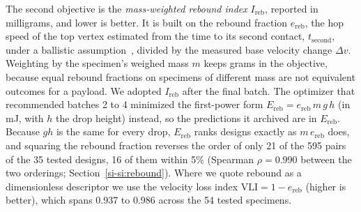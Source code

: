 \documentclass[lineno,nocopyright,upint,varvw,hyphenate]{asmejour}
\newcommand{\siref}[1]{\ref*{si-#1}}
\begin{document}
The second objective is the \emph{mass-weighted rebound index}
$I_{\mathrm{reb}}$, reported in milligrams, and lower is better. It is
built on the rebound fraction $e_{\mathrm{reb}}$, the hop speed of the
top vertex estimated from the time to its second contact,
$t_{\mathrm{second}}$, under a ballistic
assumption~\citep{bernstein1977listening}, divided by the measured base
velocity change $\Delta v$. Weighting by the specimen's weighed mass $m$
keeps grams in the objective, because equal rebound fractions on
specimens of different mass are not equivalent outcomes for a payload.
We adopted $I_{\mathrm{reb}}$ after the final batch. The optimizer that
recommended batches 2 to 4 minimized the first-power form
$E_{\mathrm{reb}} = e_{\mathrm{reb}}\, m\, g\, h$ (in mJ, with $h$ the
drop height) instead, so the predictions it archived are in
$E_{\mathrm{reb}}$. Because $g h$ is the same for every drop,
$E_{\mathrm{reb}}$ ranks designs exactly as $m\,e_{\mathrm{reb}}$ does,
and squaring the rebound fraction reverses the order of only 21 of the
595 pairs of the 35 tested designs, 16 of them within 5\% (Spearman
$\rho = 0.990$ between the two orderings; Section~\siref{si:rebound}).
Where we quote rebound as a dimensionless descriptor we use the velocity
loss index $\mathrm{VLI} = 1 - e_{\mathrm{reb}}$ (higher is better),
which spans 0.937 to 0.986 across the 54 tested specimens.
\end{document}
